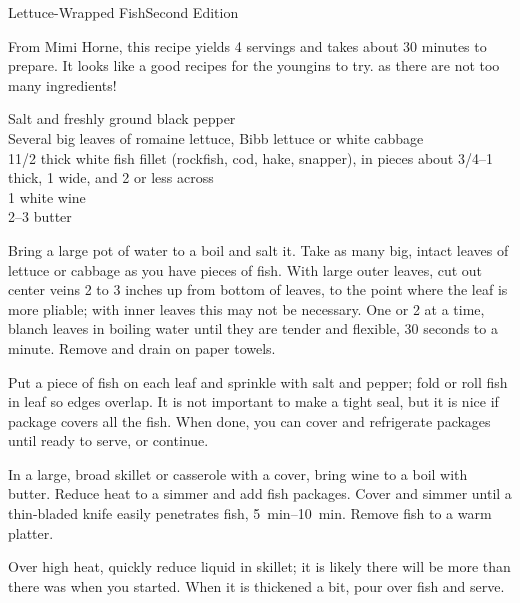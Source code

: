 \begin{entry}{Lettuce-Wrapped Fish}{Second Edition}

\begin{open}
  From Mimi Horne, this recipe yields 4 servings and takes about 30 minutes to prepare. It looks like a good recipes for the youngins to try. as there are not too many ingredients!
\end{open}
\begin{ingredients}
    Salt and freshly ground black pepper\\
    Several big leaves of romaine lettuce, Bibb lettuce or white cabbage\\
    1\SI{1/2}{\pound} thick white fish fillet (rockfish, cod, hake, snapper), in
    pieces about \SIrange[range-phrase={ to }]{3/4}{1}{\inch} thick,
    \SI{1}{\inch} wide, and \SI{2}{\inch} or less across\\
    \SI{1}{\cup} white wine\\
    \SIrange[range-phrase={ to }]{2}{3}{\tblspoon} butter
\end{ingredients}
Bring a large pot of water to a boil and salt it. Take as many big, intact
leaves of lettuce or cabbage as you have pieces of fish. With large outer
leaves, cut out center veins 2 to 3 inches up from bottom of leaves, to the
point where the leaf is more pliable; with inner leaves this may not be
necessary. One or 2 at a time, blanch leaves in boiling water until they are
tender and flexible, 30 seconds to a minute. Remove and drain on paper towels.

Put a piece of fish on each leaf and sprinkle with salt and pepper; fold or roll
fish in leaf so edges overlap. It is not important to make a tight seal, but it
is nice if package covers all the fish. When done, you can cover and refrigerate
packages until ready to serve, or continue.

In a large, broad skillet or casserole with a cover, bring wine to a boil with
butter. Reduce heat to a simmer and add fish packages. Cover and simmer until a
thin-bladed knife easily penetrates fish, \SIrange{5}{10}{\minute}. Remove fish
to a warm platter.

Over high heat, quickly reduce liquid in skillet; it is likely there will be
more than there was when you started. When it is thickened a bit, pour over fish
and serve.
\end{entry}

